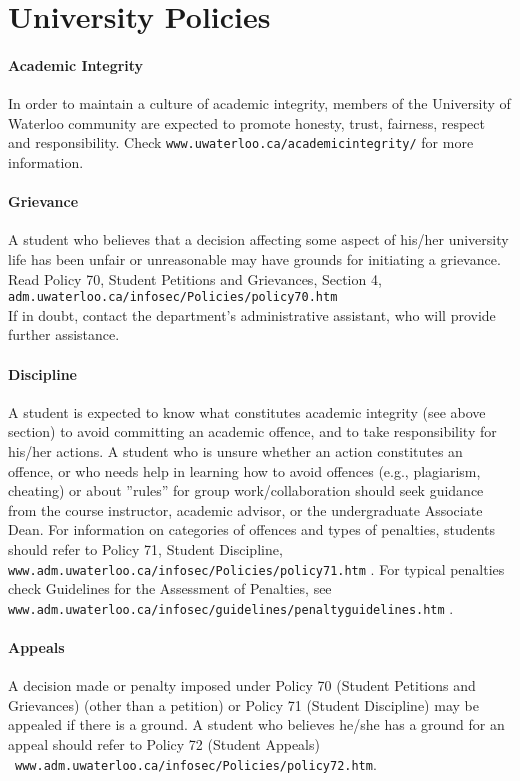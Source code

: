 \documentclass[letterpaper,10pt]{article}
\begin{document}
\section*{University Policies}

\paragraph{Academic Integrity}
In order to maintain a culture of academic integrity, members of the University of Waterloo community are expected to promote honesty, trust, fairness, respect and responsibility. Check \texttt{www.uwaterloo.ca/academicintegrity/} for more information.

\paragraph{Grievance}
A student who believes that a decision affecting some aspect of his/her university life has been unfair or unreasonable may have grounds for initiating a grievance. Read Policy 70, Student Petitions and Grievances, Section 4, \texttt{adm.uwaterloo.ca/infosec/Policies/policy70.htm} \\
If in doubt, contact the department's administrative assistant, who will provide further assistance.

\paragraph{Discipline}
A student is expected to know what constitutes academic integrity (see above section) to avoid committing an academic offence, and to take responsibility for his/her actions. A student who is unsure whether an action constitutes an offence, or who needs help in learning how to avoid offences (e.g., plagiarism, cheating) or about ''rules'' for group work/collaboration should seek guidance from the course instructor, academic advisor, or the undergraduate Associate Dean. For information on categories of offences and types of penalties, students should refer to Policy 71, Student Discipline, \texttt{www.adm.uwaterloo.ca/infosec/Policies/policy71.htm} . For typical penalties check Guidelines for the Assessment of Penalties, see \\\texttt{www.adm.uwaterloo.ca/infosec/guidelines/penaltyguidelines.htm} .

\paragraph{Appeals}
A decision made or penalty imposed under Policy 70 (Student Petitions and Grievances) (other than a petition) or Policy 71 (Student Discipline) may be appealed if there is a ground. A student who believes he/she has a ground for an appeal should refer to Policy 72 (Student Appeals)\\~\texttt{www.adm.uwaterloo.ca/infosec/Policies/policy72.htm}.
\end{document}
